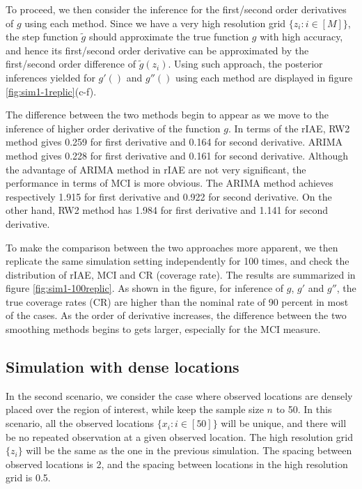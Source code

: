 \documentclass{article}
\begin{document}
To proceed, we then consider the inference for the first/second order derivatives of $g$ using each method. Since we have a very high resolution grid $\{z_i: i\in [M]\}$, the step function $\tilde{g}$ should approximate the true function $g$ with high accuracy, and hence its first/second order derivative can be approximated by the first/second order difference of $\tilde{g}(z_i)$. Using such approach, the posterior inferences yielded for $g'()$ and $g''()$ using each method are displayed in figure \ref{fig:sim1-1replic}(c-f). 

The difference between the two methods begin to appear as we move to the inference of higher order derivative of the function $g$. In terms of the rIAE, RW2 method gives 0.259 for first derivative and 0.164 for second derivative. ARIMA method gives 0.228 for first derivative and 0.161 for second derivative. Although the advantage of ARIMA method in rIAE are not very significant, the performance in terms of MCI is more obvious. The ARIMA method achieves respectively 1.915 for first derivative and 0.922 for second derivative. On the other hand, RW2 method has 1.984 for first derivative and 1.141 for second derivative.

To make the comparison between the two approaches more apparent, we then replicate the same simulation setting independently for 100 times, and check the distribution of rIAE, MCI and CR (coverage rate). The results are summarized in figure \ref{fig:sim1-100replic}. As shown in the figure, for inference of $g$, $g'$ and $g''$, the true coverage rates (CR) are higher than the nominal rate of 90 percent in most of the cases. As the order of derivative increases, the difference between the two smoothing methods begins to gets larger, especially for the MCI measure. 





\subsection{Simulation with dense locations}

In the second scenario, we consider the case where observed locations are densely placed over the region of interest, while keep the sample size $n$ to 50. In this scenario, all the observed locations $\{x_i: i\in [50]\}$ will be unique, and there will be no repeated observation at a given observed location. The high resolution grid $\{z_i\}$ will be the same as the one in the previous simulation. The spacing between observed locations is 2, and the spacing between locations in the high resolution grid is 0.5. 
\end{document}
